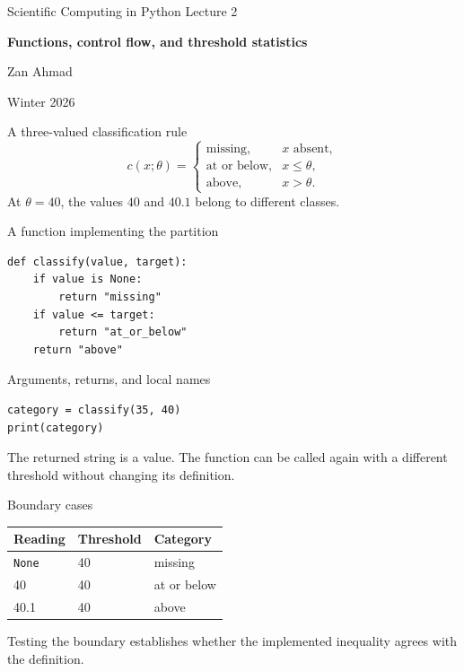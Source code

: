 \documentclass[aspectratio=169,11pt]{beamer}
\newcommand{\notestarget}{notes.pdf}\newcommand{\noteslabel}{Notes}
\begin{document}
\begin{frame}[plain]\vfill
{\small\color{accent} Scientific Computing in Python \quad Lecture 2}\par\medskip
{\raggedright{}\LARGE\bfseries\color{ink} Functions, control flow, and threshold statistics}\par\bigskip
Zan Ahmad\par\smallskip
{\small Winter 2026}\par\vfill\end{frame}
\renewcommand{\notestarget}{notes.pdf\#note-a-three-valued-classification-rule}
\begin{frame}[t,fragile,label=slide-a-three-valued-classification-rule]{A three-valued classification rule}
\[
c(x;\theta)=\begin{cases}\text{missing},&x\text{ absent},\\\text{at or below},&x\leq\theta,\\\text{above},&x>\theta.\end{cases}
\]
\pause{}
At $\theta=40$, the values $40$ and $40.1$ belong to different classes.
\end{frame}
\renewcommand{\notestarget}{notes.pdf\#note-a-three-valued-classification-rule}
\begin{frame}[t,fragile,label=slide-a-function-implementing-the-partition]{A function implementing the partition}
\begin{verbatim}
def classify(value, target):
    if value is None:
        return "missing"
    if value <= target:
        return "at_or_below"
    return "above"
\end{verbatim}
\end{frame}
\renewcommand{\notestarget}{notes.pdf\#note-arguments-returns-and-local-names}
\begin{frame}[t,fragile,label=slide-arguments-returns-and-local-names]{Arguments, returns, and local names}
\begin{verbatim}
category = classify(35, 40)
print(category)
\end{verbatim}
\pause{}
The returned string is a value. The function can be called again with a different threshold without changing its definition.
\end{frame}
\renewcommand{\notestarget}{notes.pdf\#note-a-three-valued-classification-rule}
\begin{frame}[t,fragile,label=slide-boundary-cases]{Boundary cases}
\begin{center}\begin{tabular}{lll}\toprule
Reading & Threshold & Category\\\midrule
\texttt{None}&40&missing\\40&40&at or below\\40.1&40&above\\\bottomrule\end{tabular}\end{center}
\pause{}
Testing the boundary establishes whether the implemented inequality agrees with the definition.
\end{frame}
\end{document}
